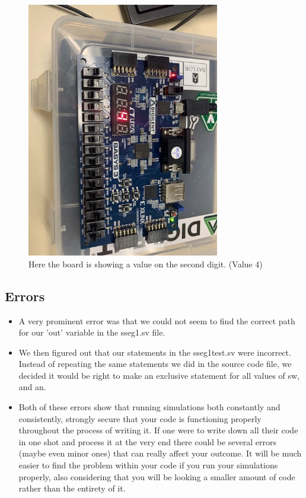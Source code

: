 \documentclass[11pt]{article}
\begin{document}
\begin{figure}[ht]\centering
	\includegraphics[width=0.75\textwidth, angle = 90, trim=0cm 0cm 0cm 0cm,clip]{4(2)}
	\caption{Here the board is showing a value on the second digit. (Value 4)}
	\label{fig:Board-seconddigit}	
\end{figure}

\subsection*{Errors}

	\begin{itemize}
		\item A very prominent error was that we could not seem to find the correct path for our 'out' variable in the sseg1.sv file.
		\item We then figured out that our statements in the sseg1test.sv were incorrect. Instead of repeating the same statements we did in the source code file, we decided it would be right to make an exclusive statement for all values of sw, and an.
		\item Both of these errors show that running simulations both constantly and consistently, strongly secure that your code is functioning properly throughout the process of writing it. If one were to write down all their code in one shot and process it at the very end there could be several errors (maybe even minor ones) that can really affect your outcome. It will be much easier to find the problem within your code if you run your simulations properly, also considering that you will be looking a smaller amount of code rather than the entirety of it.
		
		 
	\end{itemize}
\end{document}
